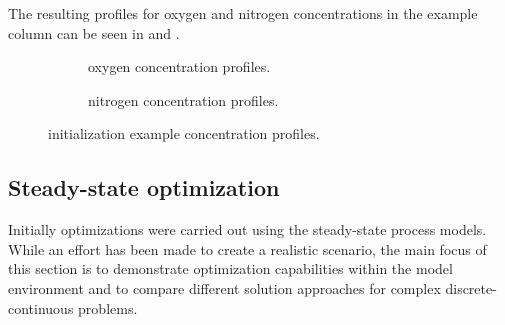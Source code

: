 
        The resulting profiles for oxygen and nitrogen concentrations in the example column can be seen
        in  and .

        \begin{figure}
            \scriptsize
            \hspace{0.01\textwidth}
            \begin{subfigure}{0.45\textwidth}
                
                \caption{oxygen concentration profiles.}
                \label{fig:lpc_example_o2}
            \end{subfigure}
            \hfill
            \begin{subfigure}{0.45\textwidth}
                
                \caption{nitrogen concentration profiles.}
                \label{fig:lpc_example_n2}
            \end{subfigure}
            \hspace{0.01\textwidth}
            \caption{initialization example concentration profiles.}
        \end{figure}

    \subsection{Steady-state optimization}
    Initially  optimizations were carried out using the steady-state process models.
    While an effort has been made to create a realistic scenario, the main focus of this section is to demonstrate
    optimization capabilities within the model environment \gproms and to compare different solution
    approaches for complex discrete-continuous problems.

